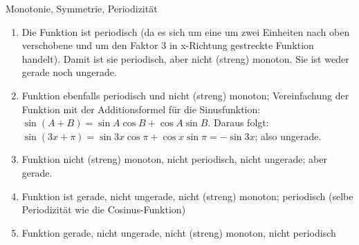 \item Monotonie, Symmetrie, Periodizität

\begin{enumerate}

\item Die Funktion ist periodisch (da es sich um eine um zwei Einheiten nach oben verschobene und um den Faktor 3 in x-Richtung gestreckte Funktion handelt). Damit ist sie periodisch, aber nicht (streng) monoton. Sie ist weder gerade noch ungerade.

\item Funktion ebenfalls periodisch und nicht (streng) monoton; Vereinfachung der Funktion mit der Additionsformel für die Sinusfunktion: 
$\sin(A+B)=\sin A \cos B+\cos A \sin B$. Daraus folgt: $\sin(3x+\pi)=\sin 3x \cos \pi + \cos x \sin \pi = - \sin 3x $; also ungerade.

\item Funktion nicht (streng) monoton, nicht periodisch, nicht ungerade; aber gerade.

\item Funktion ist gerade, nicht ungerade, nicht (streng) monoton; periodisch (selbe Periodizität wie die Cosinus-Funktion)

\item Funktion gerade, nicht ungerade, nicht (streng) monoton, nicht periodisch

\end{enumerate}

